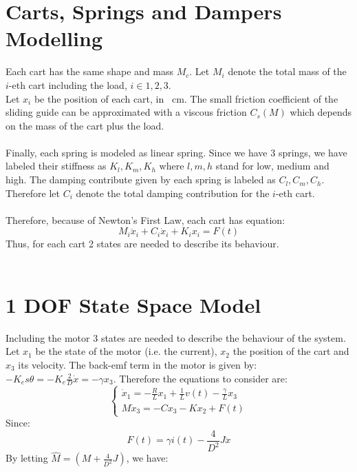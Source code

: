 \section{Carts, Springs and Dampers Modelling}
Each cart has the same shape and mass $M_{c}$. Let $M_{i}$ denote the total mass of the $i$-eth cart including the load, $i \in {1,2,3}$. \\
Let $x_{i}$ be the position of each cart, in \SI{}{\cm}. The small friction coefficient of the sliding guide can be approximated with a viscous friction $C_{s}(M)$ which depends on the mass of the cart plus the load. \\ \\
Finally, each spring is modeled as linear spring. Since we have 3 springs, we have labeled their stiffness as $K_l, K_m, K_h$ where $l,m,h$ stand for low, medium and high. The damping contribute given by each spring is labeled as $C_l, C_m, C_h$. Therefore let $C_{i}$ denote the total damping contribution for the $i$-eth cart.\\ \\
Therefore, because of Newton's First Law, each cart has equation:
\begin{equation}M_i \ddot{x}_i + C_{i} \dot{x}_i + K_{i}x_{i}=F(t)
\end{equation}
Thus, for each cart 2 states are needed to describe its behaviour.\\ \\
\section{1 DOF State Space Model}
Including the motor 3 states are needed to describe the behaviour of the system. Let $x_{1}$ be the state of the motor (i.e. the current), $x_{2}$ the position of the cart and $x_{3}$ its velocity. The back-emf term in the motor is given by: $-K_e s \theta = -K_e \frac{2}{D}\dot{x} = -\gamma x_3$. Therefore the equations to consider are:
\begin{equation}
\begin{cases}
\dot{x}_1 = -\frac{R}{L}x_{1}+\frac{1}{L} v(t)-\frac{\gamma}{L}x_3  \\
M\dot{x}_3 = -Cx_3 -K x_2 + F(t)
\end{cases}
\end{equation}
Since:
\begin{equation}F(t)=\gamma i(t) - \frac{4}{D^2}J \ddot{x}\end{equation}
By letting $\hat{M} = (M+\frac{4}{D^2}J)$, we have:

